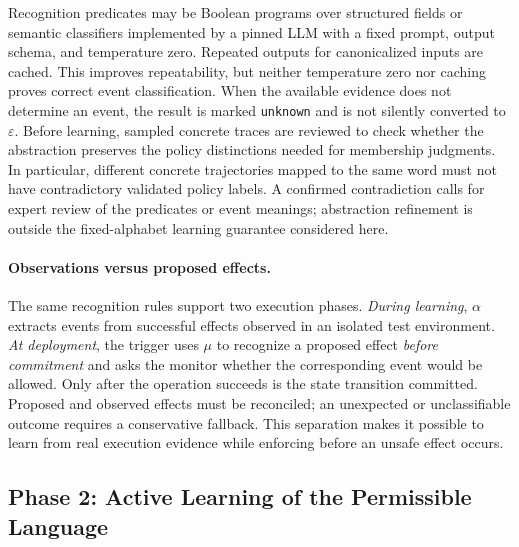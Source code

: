Recognition predicates may be Boolean programs over structured fields or semantic classifiers implemented by a pinned LLM with a fixed prompt, output schema, and temperature zero. Repeated outputs for canonicalized inputs are cached. This improves repeatability, but neither temperature zero nor caching proves correct event classification. When the available evidence does not determine an event, the result is marked \texttt{unknown} and is not silently converted to $\varepsilon$. Before learning, sampled concrete traces are reviewed to check whether the abstraction preserves the policy distinctions needed for membership judgments. In particular, different concrete trajectories mapped to the same word must not have contradictory validated policy labels. A confirmed contradiction calls for expert review of the predicates or event meanings; abstraction refinement is outside the fixed-alphabet learning guarantee considered here.

\paragraph{Observations versus proposed effects.}
The same recognition rules support two execution phases. \emph{During learning}, $\alpha$ extracts events from successful effects observed in an isolated test environment. \emph{At deployment}, the trigger uses $\mu$ to recognize a proposed effect \emph{before commitment} and asks the monitor whether the corresponding event would be allowed. Only after the operation succeeds is the state transition committed. Proposed and observed effects must be reconciled; an unexpected or unclassifiable outcome requires a conservative fallback. This separation makes it possible to learn from real execution evidence while enforcing before an unsafe effect occurs.

\subsection{Phase 2: Active Learning of the Permissible Language}\label{sec:lstar}
